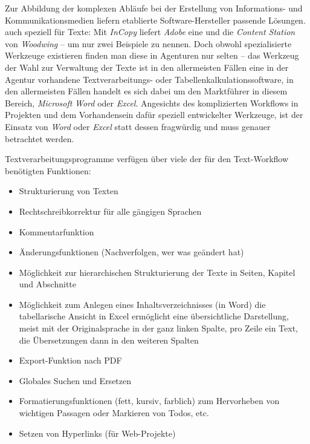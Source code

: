 Zur Abbildung der komplexen Abläufe bei der Erstellung von Informations- und Kommunikationsmedien liefern etablierte Software-Hersteller passende Lösungen. auch speziell für Texte: Mit \emph{InCopy} liefert \emph{Adobe} eine  \cite{adobeincopy} und  die \emph{Content Station} von \emph{Woodwing}  \cite{woodwing} – um nur zwei Beispiele zu nennen. Doch obwohl spezialisierte Werkzeuge existieren finden man diese in Agenturen nur selten – das Werkzeug der Wahl zur Verwaltung der Texte ist in den allermeisten Fällen eine in der Agentur vorhandene Textverarbeitungs- oder Tabellenkalkulationssoftware, in den allermeisten Fällen handelt es sich dabei um den Marktführer in diesem Bereich, \emph{Microsoft} \emph{Word} oder \emph{Excel}. Angesichts des komplizierten Workflows in Projekten und dem Vorhandensein dafür speziell entwickelter Werkzeuge, ist der Einsatz von \emph{Word} oder \emph{Excel} statt dessen fragwürdig und muss genauer betrachtet werden. 


Textverarbeitungsprogramme verfügen über viele der für den Text-Workflow benötigten Funktionen:  

\begin{itemize}
\item{Strukturierung von Texten}
\item{Rechtschreibkorrektur für alle gängigen Sprachen}
\item{Kommentarfunktion}
\item{Änderungsfunktionen (Nachverfolgen, wer was geändert hat)}
\item{Möglichkeit zur hierarchischen Strukturierung der Texte in Seiten, Kapitel und Abschnitte}
\item{Möglichkeit zum Anlegen eines Inhaltsverzeichnisses (in Word)
die tabellarische Ansicht in Excel ermöglicht eine übersichtliche Darstellung, meist mit der Originalsprache in der ganz linken Spalte, pro Zeile ein Text, die Übersetzungen dann in den weiteren Spalten}
\item{Export-Funktion nach PDF}
\item{Globales Suchen und Ersetzen}
\item{Formatierungsfunktionen (fett, kursiv, farblich) zum Hervorheben von wichtigen Passagen oder Markieren von Todos, etc.}
\item{Setzen von Hyperlinks (für Web-Projekte)}
\end{itemize}

